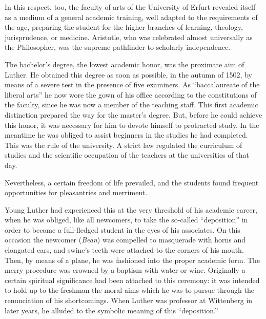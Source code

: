 In this respect, too, the faculty of arts of the University of Erfurt
revealed itself as a medium of a general academic training, well
adapted to the requirements of the age, preparing the student for
the higher branches of learning, theology, jurisprudence, or medicine.
Aristotle, who was celebrated almost universally as the Philosopher,
was the supreme pathfinder to scholarly independence.

The bachelor’s degree, the lowest academic honor, was the proximate
aim of Luther. He obtained this degree as soon as possible, in the
autumn of 1502, by means of a severe test in the presence of five
examiners. As “baccalaureate of the liberal arts” he now wore the gown
of his office according to the constitutions of the faculty, since he was
now a member of the teaching staff. This first academic distinction
prepared the way for the master’s degree. But, before he could achieve
this honor, it was necessary for him to devote himself to protracted
study. In the meantime he was obliged to assist beginners in the
studies he had completed. This was the rule of the university. A strict
law regulated the curriculum of studies and the scientific occupation
of the teachers at the universities of that day.

Nevertheless, a certain freedom of life prevailed, and the students
found frequent opportunities for pleasantries and merriment.

Young Luther had experienced this at the very threshold of his
academic career, when he was obliged, like all newcomers, to take the
so-called “deposition” in order to become a full-fledged student in the
eyes of his associates. On this occasion the newcomer (\textit{Bean}) was compelled
to masquerade with horns and elongated ears, and swine’s teeth
were attached to the corners of his mouth. Then, by means of a plane,
he was fashioned into the proper academic form. The merry procedure
was crowned by a baptism with water or wine. Originally a certain
spiritual significance had been attached to this ceremony: it was
intended to hold up to the freshman the moral aims which he was to
pursue through the renunciation of his shortcomings. When Luther
was professor at Wittenberg in later years, he alluded to the symbolic
meaning of this “deposition.”

